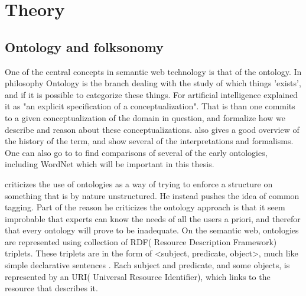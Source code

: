
\chapter{Theory} %

\label{Theory} %


\section{Ontology and folksonomy}
One of the central concepts in semantic web technology is that of the ontology. 
In philosophy Ontology is the branch dealing with the study of which things 'exists', and if it is possible to categorize these things. 
For artificial intelligence \citet{Gruber1993} explained it as "an explicit specification of a conceptualization". 
That is than one commits to a given conceptualization of the domain in question, and formalize how we describe and reason about these conceptualizations. 
\citet{Pretorius2004} also gives a good overview of the history of the term, and show several of the interpretations and formalisms. 
One can also go to \citet{Noy1997} to find comparisons of several of the early ontologies, including WordNet which will be important in this thesis.

\citet{Shirky2007} criticizes the use of ontologies as a way of trying to enforce a structure on something that is by nature unstructured. 
He instead pushes the idea of common tagging. 
Part of the reason he criticizes the ontology approach is that it seem improbable that experts can know the needs of all the users a priori, and therefor that every ontology will prove to be inadequate.
On the semantic web, ontologies are represented using collection of RDF( Resource Description Framework) triplets. 
These triplets are in the form of <subject, predicate, object>, much like simple declarative sentences \citep{Berners-Lee2001}. 
Each subject and predicate, and some objects, is represented by an URI( Universal Resource Identifier), which links to the resource that describes it.

